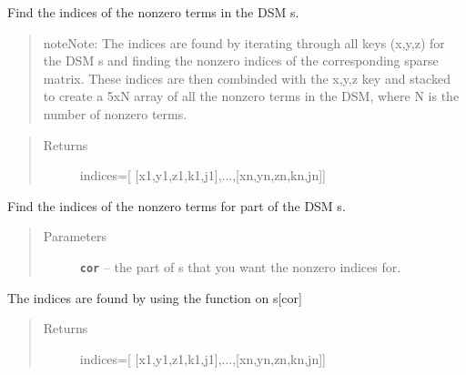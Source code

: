 \documentclass[letterpaper,10pt,english]{sphinxmanual}
\begin{document}
\begin{fulllineitems}

\begin{fulllineitems}
\label{index:DictionarySparseMatrix.DS.nonzero}
Find the indices of the nonzero terms in the DSM s.
\begin{quote}

\begin{notice}{note}{Note:}
The indices are found by iterating through all           keys (x,y,z) for the DSM s and finding the nonzero           indices of the corresponding sparse matrix.           These indices are then combinded           with the x,y,z key and stacked to create a 5xN           array of all the nonzero terms in the DSM,           where N is the number of nonzero           terms.
\end{notice}
\end{quote}
\begin{quote}\begin{description}
\item[{Returns}] \leavevmode
indices={[} {[}x1,y1,z1,k1,j1{]},...,{[}xn,yn,zn,kn,jn{]}{]}

\end{description}\end{quote}

\end{fulllineitems}


\begin{fulllineitems}
\label{index:DictionarySparseMatrix.DS.nonzeroMat}
Find the indices of the nonzero terms for part of the DSM s.
\begin{quote}\begin{description}
\item[{Parameters}] \leavevmode
\textbf{\texttt{cor}} -- the part of s that you want the nonzero indices for.

\end{description}\end{quote}

The indices are found by using the {\hyperref[index:DictionarySparseMatrix.DS.nonzero]{}} function on s{[}cor{]}
\begin{quote}\begin{description}
\item[{Returns}] \leavevmode
indices={[} {[}x1,y1,z1,k1,j1{]},...,{[}xn,yn,zn,kn,jn{]}{]}


\end{description}
\end{quote}
\end{fulllineitems}
\end{fulllineitems}
\end{document}
